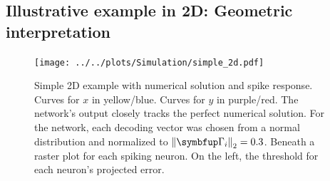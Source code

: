 \subsection{Illustrative example in 2D: Geometric interpretation}

\begin{figure}[h!]
	\centering
	\texttt{[image: ../../plots/Simulation/simple\_2d.pdf]}
	\caption{Simple 2D example with numerical solution and spike response. Curves for $x$ in yellow/blue. Curves for $y$ in purple/red. The network's output closely tracks the perfect numerical solution. For the network, each decoding vector was chosen from a normal distribution and normalized to $\left\lVert\bmu{\Gamma}_i\right\rVert_2 =0.3$. Beneath a raster plot for each spiking neuron. On the left, the threshold for each neuron's projected error.}
	\label{fig:sim_res_simple}
\end{figure}


